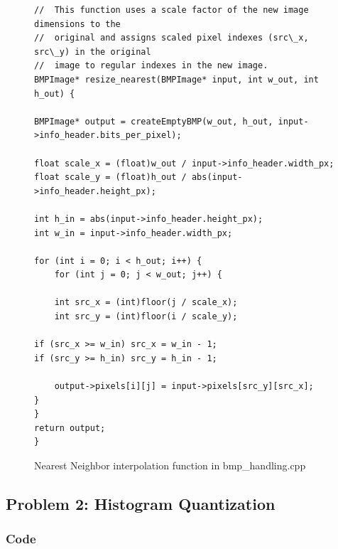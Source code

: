 \documentclass[11pt]{article}
\begin{document}
\begin{figure}[H]
	\begin{verbatim}
//  This function uses a scale factor of the new image dimensions to the 
//  original and assigns scaled pixel indexes (src\_x, src\_y) in the original 
//  image to regular indexes in the new image. 
BMPImage* resize_nearest(BMPImage* input, int w_out, int h_out) {

BMPImage* output = createEmptyBMP(w_out, h_out, input->info_header.bits_per_pixel);

float scale_x = (float)w_out / input->info_header.width_px;
float scale_y = (float)h_out / abs(input->info_header.height_px);

int h_in = abs(input->info_header.height_px);
int w_in = input->info_header.width_px;

for (int i = 0; i < h_out; i++) {
    for (int j = 0; j < w_out; j++) {

    int src_x = (int)floor(j / scale_x);
    int src_y = (int)floor(i / scale_y);

if (src_x >= w_in) src_x = w_in - 1;
if (src_y >= h_in) src_y = h_in - 1;

    output->pixels[i][j] = input->pixels[src_y][src_x];
}
}
return output;
}
	\end{verbatim}
	
	\caption{Nearest Neighbor interpolation function in bmp\_handling.cpp}
	\label{figure:Nearest}
\end{figure}






\subsection{Problem 2: Histogram Quantization }

\subsubsection{Code}
\end{document}
